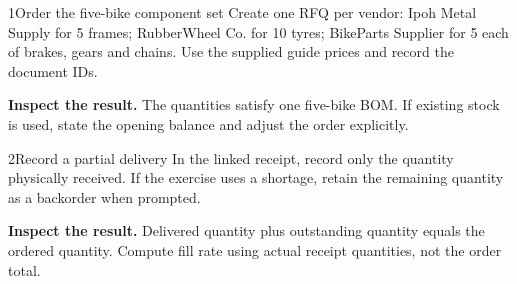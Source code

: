 
\begin{labquestion}{1}{Order the five-bike component set}
Create one RFQ per vendor: Ipoh Metal Supply for 5 frames; RubberWheel Co. for 10 tyres; BikeParts Supplier for 5 each of brakes, gears and chains. Use the supplied guide prices and record the document IDs.
\end{labquestion}
\begin{labanswer}\textbf{Inspect the result.} The quantities satisfy one five-bike BOM. If existing stock is used, state the opening balance and adjust the order explicitly.\end{labanswer}

\begin{labquestion}{2}{Record a partial delivery}
In the linked receipt, record only the quantity physically received. If the exercise uses a shortage, retain the remaining quantity as a backorder when prompted.
\end{labquestion}
\begin{labanswer}\textbf{Inspect the result.} Delivered quantity plus outstanding quantity equals the ordered quantity. Compute fill rate using actual receipt quantities, not the order total.\end{labanswer}
